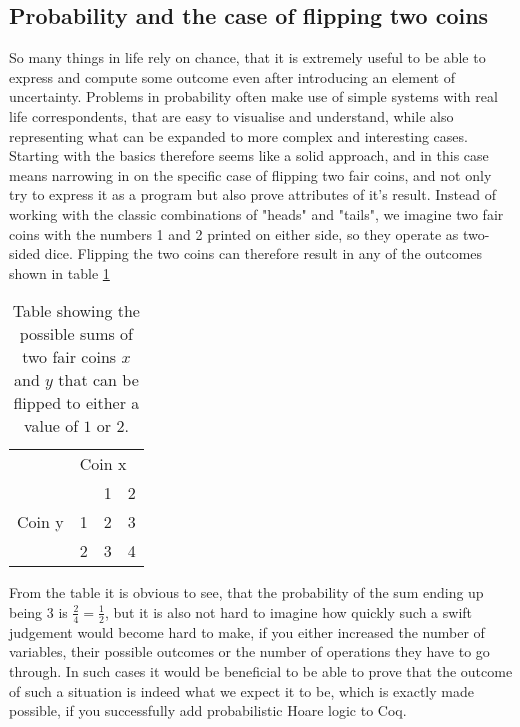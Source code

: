 \subsection{Probability and the case of flipping two coins}\label{backgroundCoins}
So many things in life rely on chance, that it is extremely useful to be able to express and compute some outcome even after introducing an element of uncertainty.
Problems in probability often make use of simple systems with real life correspondents, that are easy to visualise and understand, while also representing what can be expanded to more complex and interesting cases. Starting with the basics therefore seems like a solid approach, and in this case means narrowing in on the specific case of flipping two fair coins, and not only try to express it as a program but also prove attributes of it's result. Instead of working with the classic combinations of "heads" and "tails", we imagine two fair coins with the numbers 1 and 2 printed on either side, so they operate as two-sided dice. Flipping the two coins can therefore result in any of the outcomes shown in table \ref{tab:twoCoins}



\begin{table}[H]
\centering
\begin{tabular}{ll|ll}

                        & \multicolumn{3}{l}{Coin x} \\ 
\multirow{3}{*}{Coin y} &         & 1       & 2      \\ \hline
                        & 1       & 2       & 3      \\ 
                        & 2       & 3       & 4
                        
               
\end{tabular}
\caption{Table showing the possible sums of two fair coins $x$ and $y$ that can be flipped to either a value of $1$ or $2$.}
\label{tab:twoCoins}  
\end{table}

From the table it is obvious to see, that the probability of the sum ending up being $3$ is $\frac{2}{4} = \frac{1}{2}$, but it is also not hard to imagine how quickly such a swift judgement would become hard to make, if you either increased the number of variables, their possible outcomes or the number of operations they have to go through. In such cases it would be beneficial to be able to prove that the outcome of such a situation is indeed what we expect it to be, which is exactly made possible, if you successfully add probabilistic Hoare logic to Coq.   

